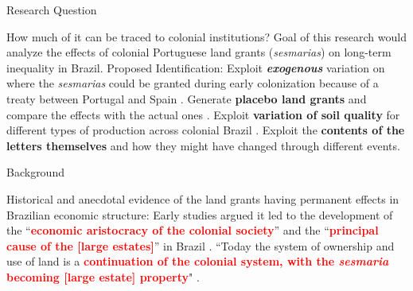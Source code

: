 \documentclass[aspectratio=1610, handout]{beamer}
\begin{document}
\begin{frame}{Research Question}
    \begin{outline}
        \1 How much of it can be traced to colonial institutions?
            \vspace{2mm}
            \2 Goal of this research would analyze the effects of colonial Portuguese land grants (\textit{sesmarias}) on long-term inequality in Brazil.
            \vspace{2mm}
        \1 Proposed Identification:
            \vspace{2mm}
            \2 Exploit \textbf{\textit{exogenous}} variation on where the \textit{sesmarias} could be granted during early colonization because of a treaty between Portugal and Spain \parencite{Laudares2022-vy}. 
            \vspace{2mm}
            \2 Generate \textbf{placebo land grants} and compare the effects with the actual ones \parencite{Dell2019-np}.
            \vspace{2mm}
            \2 Exploit \textbf{variation of soil quality} for different types of production across colonial Brazil \parencite{Wigton-Jones2020-ex}.
            \vspace{2mm}
            \2 Exploit the \textbf{contents of the letters themselves} and how they might have changed through different events.
    \end{outline}
\end{frame}

\begin{frame}{Background}
    \begin{outline}
        \1 Historical and anecdotal evidence of the land grants having permanent effects in Brazilian economic structure:
        \vspace{2mm}
            \2 Early studies argued it led to the development of the ``\textcolor{red}{\textbf{economic aristocracy of the colonial society}}'' and the ``\textcolor{red}{\textbf{principal cause of the [large estates]}}'' in Brazil \parencites[p.~36]{Lima2002-kd}[p.~48]{Da_Costa_Porto1979-dz}.
        \vspace{2mm}
            \2 ``Today the system of ownership and use of land is a \textcolor{red}{\textbf{continuation of the colonial system, with the \textit{sesmaria} becoming [large estate] property}}" \parencite[p.~18]{Andrade1980-md}.
        \vspace{2mm}
    \end{outline}    
\end{frame}
\end{document}
